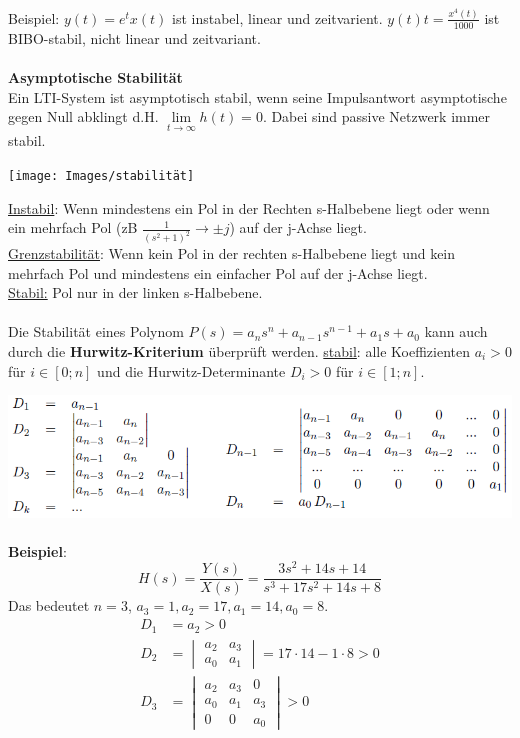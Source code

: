 Beispiel: $y(t) = e^tx(t)$ ist instabel, linear und zeitvarient. $y(t)t = \frac{x^4(t)}{1000}$ ist BIBO-stabil, nicht linear und zeitvariant.
\\ ~\\
\textbf{Asymptotische Stabilität}\\ 
Ein LTI-System ist asymptotisch stabil, wenn seine Impulsantwort asymptotische gegen Null abklingt d.H. $\lim\limits_{t\rightarrow\infty}h(t) = 0$. Dabei sind passive Netzwerk immer stabil.

\begin{center}
\texttt{[image: Images/stabilität]}
\end{center}

\noindent\underline{Instabil}: Wenn mindestens ein Pol in der Rechten s-Halbebene liegt oder wenn ein mehrfach Pol (zB $\frac{1}{(s^2 + 1)^2} \rightarrow \pm j$) auf der j-Achse liegt.\\
\underline{Grenzstabilität}: Wenn kein Pol in der rechten s-Halbebene liegt und kein mehrfach Pol und mindestens ein einfacher Pol auf der j-Achse liegt.\\
\underline{Stabil:} Pol nur in der linken s-Halbebene.\\

~\\
Die Stabilität eines Polynom $P(s) = a_ns^n + a_{n-1}s^{n-1}+a_1s + a_0$ kann auch durch die \textbf{Hurwitz-Kriterium} überprüft werden. 
\underline{stabil}: alle Koeffizienten $a_i > 0$ für $i \in [0;n]$ und die Hurwitz-Determinante $D_i > 0$ für $i\in[1;n]$.

\includegraphics[width=\columnwidth]{Images/hurwitz}
\\ ~\\
\textbf{Beispiel}:
\[
H(s) = \frac{Y(s)}{X(s)} = \frac{3s^2 + 14s + 14}{s^3 + 17s^2 + 14s + 8}
\]
Das bedeutet $n=3$, $a_3 = 1, a_2=17, a_1 = 14, a_0=8$. 
\begin{align*}
	D_1 &= a_2 > 0 \\
	D_2 &= \begin{vmatrix*} a_2 & a_3 \\ a_0 & a_1 \end{vmatrix*} = 17\cdot 14 - 1\cdot 8 > 0 \\
	D_3 &= \begin{vmatrix*} a_2 & a_3 & 0 \\ a_0 & a_1 & a_3 \\ 0 & 0 & a_0	\end{vmatrix*} > 0
\end{align*}

